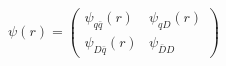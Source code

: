 \begin{equation}
\psi(r) = \left(
\begin{array}{cc}
\psi_{q\bar{q}}(r) & \psi_{qD} (r) \\
\psi_{D \bar{q}}(r) & \psi_{\bar{D} D} 
\end{array}  \right) 
\end{equation}

